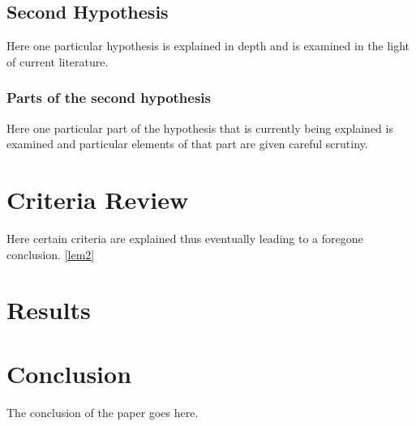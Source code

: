 
\subsection{Second Hypothesis}

Here one particular hypothesis is explained in depth
and is examined in the light of current literature.

\subsubsection{Parts of the second hypothesis}

Here one particular part of the hypothesis that is
currently being explained is examined and particular
elements of that part are given careful scrutiny.

\section{Criteria Review}

Here certain criteria are explained thus eventually
leading to a foregone conclusion. \autoref{lem2}

\section{Results}

\section{Conclusion}\label{conclusion3}

The conclusion of the paper goes here.


\printbibliography[heading=subbibnumbered]

